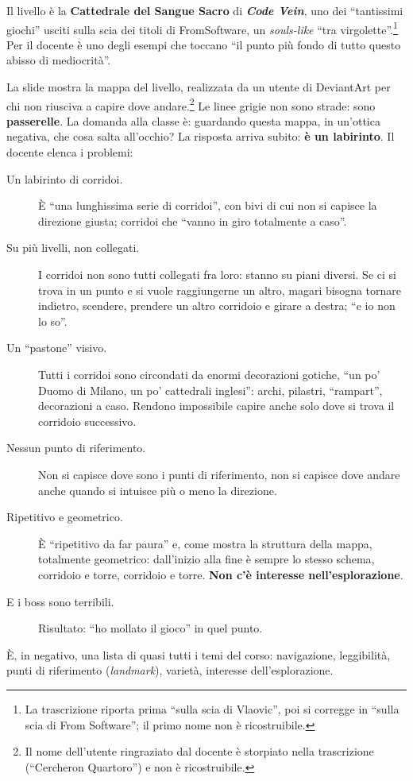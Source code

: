 Il livello è la \textbf{Cattedrale del Sangue Sacro} di \textbf{\emph{Code
Vein}}, uno dei ``tantissimi giochi'' usciti sulla scia dei titoli di
FromSoftware, un \emph{souls-like} ``tra virgolette''.\footnote{La
trascrizione riporta prima ``sulla scia di Vlaovic'', poi si corregge in
``sulla scia di From Software''; il primo nome non è ricostruibile.} Per il
docente è uno degli esempi che toccano ``il punto più fondo di tutto questo
abisso di mediocrità''.

La slide mostra la mappa del livello, realizzata da un utente di DeviantArt
per chi non riusciva a capire dove andare.\footnote{Il nome dell'utente
ringraziato dal docente è storpiato nella trascrizione (``Cercheron
Quartoro'') e non è ricostruibile.} Le linee grigie non sono strade: sono
\textbf{passerelle}. La domanda alla classe è: guardando questa mappa, in
un'ottica negativa, che cosa salta all'occhio? La risposta arriva subito:
\textbf{è un labirinto}. Il docente elenca i problemi:
\begin{description}
  \item[Un labirinto di corridoi.] È ``una lunghissima serie di
        corridoi'', con bivi di cui non si capisce la direzione giusta;
        corridoi che ``vanno in giro totalmente a caso''.
  \item[Su più livelli, non collegati.] I corridoi non sono tutti
        collegati fra loro: stanno su piani diversi. Se ci si trova in un
        punto e si vuole raggiungerne un altro, magari bisogna tornare
        indietro, scendere, prendere un altro corridoio e girare a destra;
        ``e io non lo so''.
  \item[Un ``pastone'' visivo.] Tutti i corridoi sono circondati da enormi
        decorazioni gotiche, ``un po' Duomo di Milano, un po' cattedrali
        inglesi'': archi, pilastri, ``rampart'', decorazioni a caso. Rendono
        impossibile capire anche solo dove si trova il corridoio successivo.
  \item[Nessun punto di riferimento.] Non si capisce dove sono i punti di
        riferimento, non si capisce dove andare anche quando si intuisce più
        o meno la direzione.
  \item[Ripetitivo e geometrico.] È ``ripetitivo da far paura'' e, come
        mostra la struttura della mappa, totalmente geometrico: dall'inizio
        alla fine è sempre lo stesso schema, corridoio e torre, corridoio e
        torre. \textbf{Non c'è interesse nell'esplorazione}.
  \item[E i boss sono terribili.] Risultato: ``ho mollato il gioco'' in quel
        punto.
\end{description}
È, in negativo, una lista di quasi tutti i temi del corso: navigazione,
leggibilità, punti di riferimento (\emph{landmark}), varietà, interesse
dell'esplorazione.

